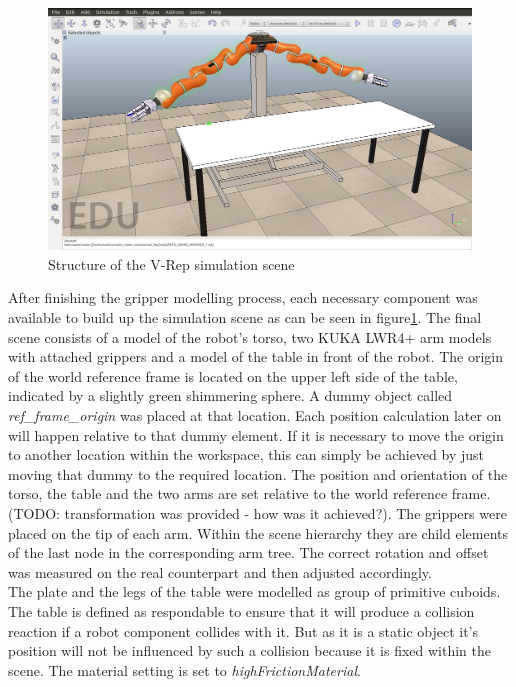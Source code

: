 \begin{figure}[ht]
	\centering
  	\includegraphics[width=1.0\textwidth]{images/simulation_scene.jpg}
	\caption{Structure of the V-Rep simulation scene}
	\label{fig:sim_scene}
\end{figure}

After finishing the gripper modelling process, each necessary component was available to build up the simulation scene as can be seen in figure\ref{fig:sim_scene}. The final scene consists of a model of the robot's torso, two KUKA LWR4+ arm models with attached grippers and a model of the table in front of the robot. The origin of the world reference frame is located on the upper left side of the table, indicated by a slightly green shimmering sphere. A dummy object called \emph{ref\_frame\_origin} was placed at that location. Each position calculation later on will happen relative to that dummy element. If it is necessary to move the origin to another location within the workspace, this can simply be achieved by just moving that dummy to the required location. The position and orientation of the torso, the table and the two arms are set relative to the world reference frame. (TODO: transformation was provided - how was it achieved?). The grippers were placed on the tip of each arm. Within the scene hierarchy they are child elements of the last node in the corresponding arm tree. The correct rotation and offset was measured on the real counterpart and then adjusted accordingly. \\

The plate and the legs of the table were modelled as group of primitive cuboids. The table is defined as respondable to ensure that it will produce a collision reaction if a robot component collides with it. But as it is a static object it's position will not be influenced by such a collision because it is fixed within the scene. The material setting is set to \emph{highFrictionMaterial}. \\

